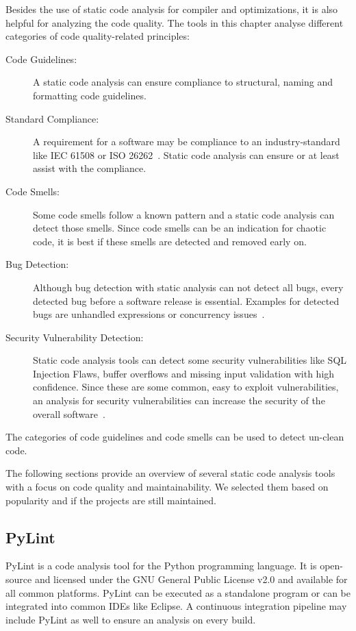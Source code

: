 Besides the use of static code analysis for compiler and optimizations, it is also helpful for analyzing the code quality. The tools in this chapter analyse different categories of code quality-related principles:
\begin{description}
    \item[Code Guidelines:] A static code analysis can ensure compliance to structural, naming and formatting code guidelines. 
    \item[Standard Compliance:] A requirement for a software may be compliance to an industry-standard like IEC 61508 or ISO 26262~\cite{tc_65sc_65a_iec_2010-1,isotc_22sc_32_iso_2018}. Static code analysis can ensure or at least assist with the compliance.  
    \item[Code Smells:] Some code smells follow a known pattern and a static code analysis can detect those smells. Since code smells can be an indication for chaotic code, it is best if these smells are detected and removed early on.
    \item[Bug Detection:] Although bug detection with static analysis can not detect all bugs, every detected bug before a software release is essential. Examples for detected bugs are unhandled expressions or concurrency issues~\cite{delaitre_evaluating_2015}.
    \item[Security Vulnerability Detection:] Static code analysis tools can detect some security vulnerabilities like SQL Injection Flaws, buffer overflows and missing input validation with high confidence. Since these are some common, easy to exploit vulnerabilities, an analysis for security vulnerabilities can increase the security of the overall software~\cite{wichers_source_nodate}.  
\end{description}
The categories of code guidelines and code smells can be used to detect un-clean code.

The following sections provide an overview of several static code analysis tools with a focus on code quality and maintainability. We selected them based on popularity and if the projects are still maintained.

\subsection{PyLint}
PyLint is a code analysis tool for the Python programming language. It is open-source and licensed under the GNU General Public License v2.0 and available for all common platforms. PyLint can be executed as a standalone program or can be integrated into common IDEs like Eclipse. A continuous integration pipeline may include PyLint as well to ensure an analysis on every build.

